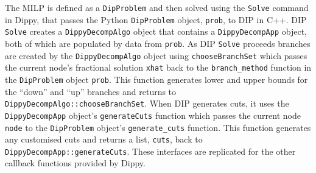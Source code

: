 \begin{sloppypar}The \ac{MILP} is defined as a \lstinline{DipProblem} and then solved using the \lstinline{Solve} command in Dippy, that passes the Python \lstinline{DipProblem} object, \lstinline{prob}, to DIP in C++.
\ac{DIP} \lstinline{Solve} creates a \lstinline{DippyDecompAlgo} object that contains a \lstinline{DippyDecompApp} object, both of which are populated by data from \lstinline{prob}.
As \ac{DIP} \lstinline{Solve} proceeds branches are created by the \lstinline{DippyDecompAlgo} object using \lstinline{chooseBranchSet} which passes the current node's fractional solution \lstinline{xhat} back to the \lstinline{branch_method} function in the \lstinline{DipProblem} object \lstinline{prob}.
This function generates lower and upper bounds for the ``down'' and ``up'' branches and returns to \lstinline{DippyDecompAlgo::chooseBranchSet}.
When \ac{DIP} generates cuts, it uses the \lstinline{DippyDecompApp} object's \lstinline{generateCuts} function which passes the current node \lstinline{node} to the \lstinline{DipProblem} object's \lstinline{generate_cuts} function.
This function generates any customised cuts and returns a list, \lstinline{cuts}, back to \lstinline{DippyDecompApp::generateCuts}.
These interfaces are replicated for the other callback functions provided by Dippy.\end{sloppypar}
